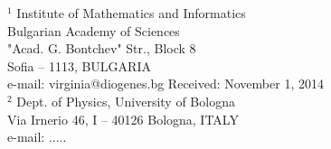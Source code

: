 \documentclass[twoside,reqno,11pt]{fcaa-var} %
\begin{document}

 \bigskip \smallskip

 \it

 \noindent
$^1$ Institute of Mathematics and Informatics \\
Bulgarian Academy of Sciences \\
"Acad. G. Bontchev" Str., Block 8 \\
Sofia -- 1113, BULGARIA  \\[4pt]
  e-mail: virginia@diogenes.bg
\hfill Received: November 1, 2014 \\[12pt]
$^2$ Dept. of Physics, University of Bologna\\
Via Irnerio 46, I -- 40126 Bologna, ITALY \\[4pt]
  e-mail: .....
\end{document}
